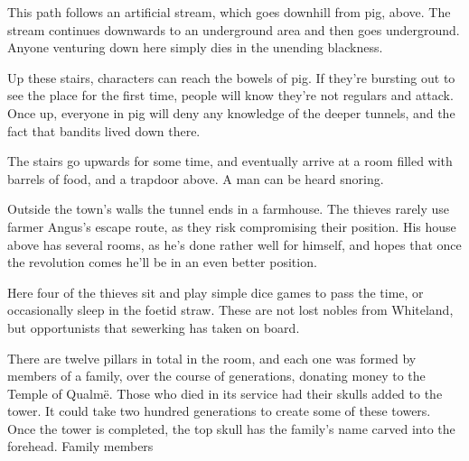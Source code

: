 \begin{multicols}{2}
\label{pigexit}

\label{slidein}

This path follows an artificial stream, which goes downhill from \gls{pig}, above.
The stream continues downwards to an underground area and then goes underground.
Anyone venturing down here simply dies in the unending blackness.



Up these stairs, characters can reach the bowels of \gls{pig}.
If they're bursting out to see the place for the first time, people will know they're not regulars and attack.
Once up, everyone in \gls{pig} will deny any knowledge of the deeper tunnels, and the fact that bandits lived down there.


\begin{boxtext}

	The stairs go upwards for some time, and eventually arrive at a room filled with barrels of food, and a trapdoor above.  A man can be heard snoring.

\end{boxtext}

Outside the town's walls the tunnel ends in a farmhouse.  The thieves rarely use farmer Angus's escape route, as they risk compromising their position.  His house above has several rooms, as he's done rather well for himself, and hopes that once the revolution comes he'll be in an even better position.


Here four of the thieves sit and play simple dice games to pass the time, or occasionally sleep in the foetid straw.
These are not lost nobles from Whiteland, but opportunists that \gls{sewerking} has taken on board.


\humanthief


There are twelve pillars in total in the room, and each one was formed by members of a family, over the course of generations, donating money to the Temple of Qualm\"{e}.  Those who died in its service had their skulls added to the tower.  It could take two hundred generations to create some of these towers.  Once the tower is completed, the top skull has the family's name carved into the forehead.  Family members


\end{multicols}
